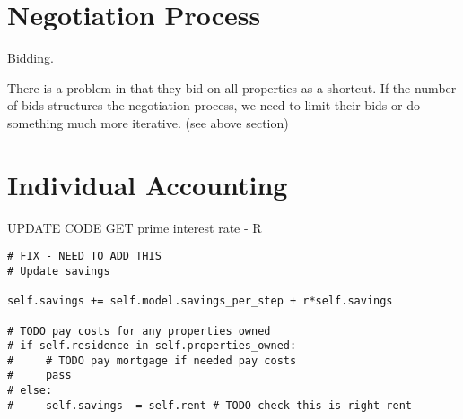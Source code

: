 \section{Negotiation Process}

Bidding.

There is a problem in that they bid on all properties as a shortcut. If the number of bids structures the negotiation process, we need to limit their bids or do something much more iterative. (see above section)


\section{Individual Accounting}
UPDATE CODE
GET prime interest rate - R
\begin{lstlisting}
# FIX - NEED TO ADD THIS
# Update savings

self.savings += self.model.savings_per_step + r*self.savings

# TODO pay costs for any properties owned
# if self.residence in self.properties_owned:
#     # TODO pay mortgage if needed pay costs
#     pass
# else:
#     self.savings -= self.rent # TODO check this is right rent
\end{lstlisting}
